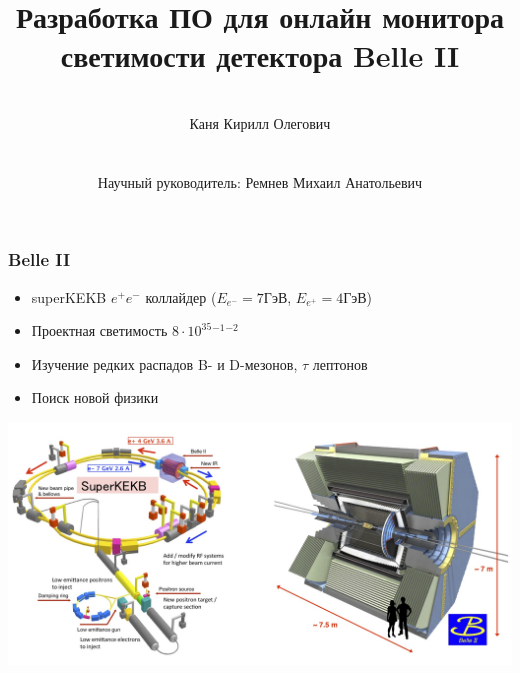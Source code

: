 \documentclass{beamer}
\title{Разработка ПО для онлайн монитора светимости детектора Belle II}
\author{\\Каня Кирилл Олегович \\~\\~\\
    Научный руководитель: Ремнев Михаил Анатольевич}
\institute{Новосибирский Государственный Университет}
\begin{document}
\begin{frame}
\titlepage
\end{frame}

\begin{frame}
\frametitle{Belle II}
  \begin{itemize}
    \item superKEKB $e^+e^-$ коллайдер ($E_{e^-}=7$ГэВ, $E_{e^+}=4$ГэВ)
    \item Проектная светимость $8\cdot10^{35}$$^{-1}$$^{-2}$
    \item Изучение редких распадов B- и D-мезонов, $\tau$ лептонов
    \item Поиск новой физики
  \end{itemize}
  \includegraphics[width=\textwidth]{SuperKEKB_BelleII.jpg}
\end{frame}
\end{document}
